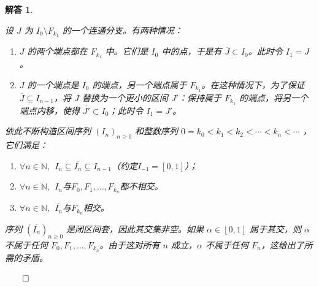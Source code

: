 \documentclass[12pt,UTF8,fontset=none]{ctexbook}
\theoremstyle{exercisestyle}
\theoremstyle{solutionstyle}
\newtheorem*{solution*}{解答}
\newenvironment{solution}
  {\begin{solution*}}
  {\hfill\ensuremath{\qed}\end{solution*}}
\begin{document}
\begin{solution}
\begin{subquestions}
    设 \( J \) 为 \( I_0 \setminus F_{k_1} \) 的一个连通分支。有两种情况：
    \begin{enumerate}
      \item \( J \) 的两个端点都在 \( F_{k_1} \) 中。它们是 \( I_0 \) 中的点，于是有 \(\overline{J} \subset I_0\)。此时令 \( I_1 = J \)。
      \item \( J \) 的一个端点是 \( I_0 \) 的端点，另一个端点属于 \( F_{k_1} \)。在这种情况下，为了保证$\overline{J}\subseteq I_{n-1}$，将 \( J \) 替换为一个更小的区间 \( J' \)：保持属于 \( F_{k_1} \) 的端点，将另一个端点内移，使得 \(\overline{J'} \subset I_0\)；此时令 \( I_1 = J' \)。
    \end{enumerate}
    依此不断构造区间序列 \((I_n)_{n\geqslant 0}\) 和整数序列 \(0 = k_0 < k_1 < k_2 < \cdots < k_n < \cdots\) ，它们满足：
    \begin{enumerate}
      \item $\forall n\in\mathbb{N},\;\, I_n \subseteq \overline{I_n} \subseteq I_{n-1} $（约定$I_{-1} = [0,1]$）；
      \item $\forall n\in\mathbb{N},\;\,I_n$与$F_0, F_1, \ldots, F_{k_n}$都不相交。
      \item $\forall n\in\mathbb{N},\;\,\overline{I_n}$与$F_{k_n}$相交。
    \end{enumerate}

    序列 \((\overline{I_n})_{n\geqslant 0}\) 是闭区间套，因此其交集非空。如果 \(\alpha \in [0,1]\) 属于其交，则 \(\alpha\) 不属于任何 \(F_0, F_1, \ldots, F_{k_n}\)。由于这对所有 \(n\) 成立，\(\alpha\) 不属于任何 \(F_n\)，这给出了所需的矛盾。
  \end{subquestions}

\end{solution}
\end{document}
